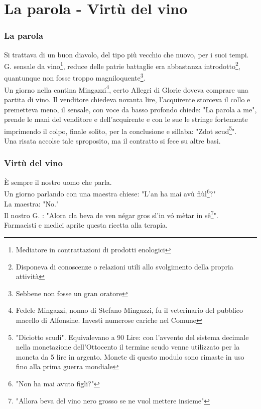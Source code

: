 \documentclass[10pt]{memoir} %
\begin{document}

\chapter{La parola - Virtù del vino}
\subsection{La parola}
Si trattava di un buon diavolo, del tipo più vecchio che nuovo, per i suoi tempi. G. \: \: sensale da vino\footnote{Mediatore in contrattazioni di prodotti enologici}, reduce delle patrie battaglie era abbastanza introdotto\footnote{Disponeva di conoscenze o relazioni utili allo svolgimento della propria attività}, quantunque non fosse troppo magniloquente\footnote{Sebbene non fosse un gran oratore}.\\
Un giorno nella cantina Mingazzi\footnote{Fedele Mingazzi, nonno di Stefano Mingazzi, fu il veterinario del pubblico macello di Alfonsine. Investì numerose cariche nel Comune}, certo Allegri di Glorie doveva comprare una partita di vino. Il venditore chiedeva novanta lire, l'acquirente storceva il collo e premetteva meno, il sensale, con voce da basso profondo chiede: "La parola a me", prende le mani del venditore e dell'acquirente e con le sue le stringe fortemente imprimendo il colpo, finale solito, per la conclusione e sillaba: "Zdot scud\footnote{"Diciotto scudi". Equivalevano a 90 Lire: con l'avvento del sistema decimale nella monetazione dell'Ottocento il termine scudo venne utilizzato per la moneta da 5 lire in argento. Monete di questo modulo sono rimaste in uso fino alla prima guerra mondiale}".\\
Una risata accolse tale sproposito, ma il contratto si fece su altre basi.
\subsection{Virtù del vino}
È sempre il nostro uomo che parla.\\
Un giorno parlando con una maestra chiese: "L'an ha mai avù fiùl\footnote{"Non ha mai avuto figli?"}?"\\
La maestra: "No."\\
Il nostro G. \:\:\:\:: "Alora cla beva de ven négar gros sl'in vó mètar in sê\footnote{"Allora beva del vino nero grosso se ne vuol mettere insieme"}".\\
Farmacisti e medici aprite questa ricetta alla terapia. 
\end{document}
